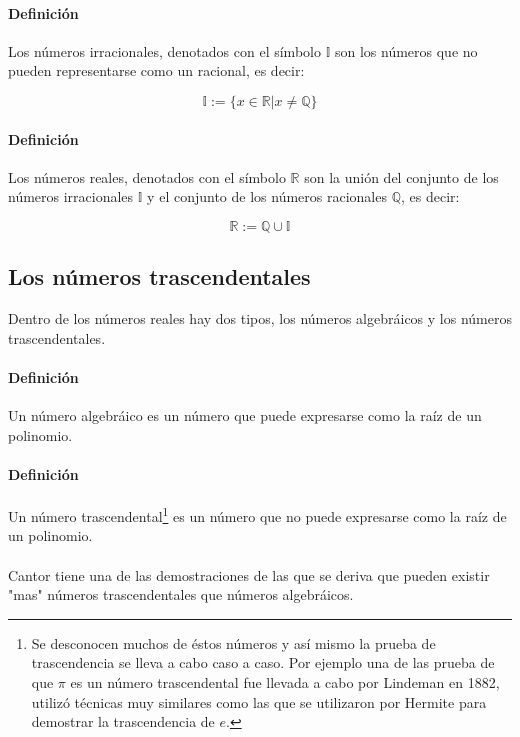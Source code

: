 \documentclass{article}
\begin{document}
\paragraph{Definición} Los números irracionales, denotados con el símbolo $\mathbb{I}$ son los números que no pueden representarse como un racional, es decir:

$$\mathbb{I} := \{x \in \mathbb{R} | x \neq \mathbb{Q} \}$$

\paragraph{Definición} Los números reales, denotados con el símbolo $\mathbb{R}$ son la unión del conjunto de los números irracionales $\mathbb{I}$ y el conjunto de los números racionales $\mathbb{Q}$, es decir:

$$\mathbb{R} := \mathbb{Q} \cup \mathbb{I} $$

\subsection{Los números trascendentales}

Dentro de los números reales hay dos tipos, los números algebráicos y los números trascendentales.

\paragraph{Definición} Un número algebráico es un número que puede expresarse como la raíz de un polinomio.

\paragraph{Definición} Un número trascendental\footnote{Se desconocen muchos de éstos números y así mismo la prueba de trascendencia se lleva a cabo caso a caso. Por ejemplo una de las prueba de que $\pi$ es un número trascendental fue llevada a cabo por Lindeman en 1882, utilizó técnicas muy similares como las que se utilizaron por Hermite para demostrar la trascendencia de $e$.} es un número que no puede expresarse como la raíz de un polinomio.


\paragraph{}
Cantor tiene una de las demostraciones de las que se deriva que pueden existir "mas" números trascendentales que números algebráicos\cite{niven_1961}.
\end{document}
